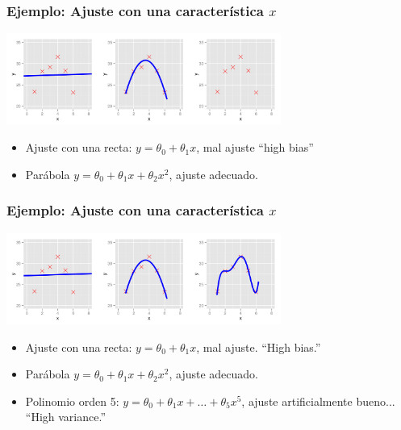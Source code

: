 \documentclass{beamer}
\begin{document}
    \begin{frame}\frametitle{Ejemplo: Ajuste con una característica $x$}
   \begin{overlayarea}{\textwidth}{8cm} 
 \begin{center}
   \includegraphics[height=3cm]{xyregularization120.png}
 \end{center}
     \begin{itemize}
 \item Ajuste con una recta: $y=\theta_0+\theta_1x$, mal ajuste ``high bias'' 
    \item Parábola $y=\theta_0+\theta_1x+\theta_2x^2$, ajuste adecuado.
 \end{itemize}

   \end{overlayarea}

 \end{frame}
      \begin{frame}\frametitle{Ejemplo: Ajuste con una característica $x$}
   \begin{overlayarea}{\textwidth}{8cm} 
 \begin{center}
   \includegraphics[height=3cm]{xyregularization123.png}
 \end{center}
     \begin{itemize}
 \item Ajuste con una recta: $y=\theta_0+\theta_1x$, mal ajuste. ``High bias.'' 
 \item Parábola $y=\theta_0+\theta_1x+\theta_2x^2$, ajuste adecuado.
 \item Polinomio orden 5: $y=\theta_0+\theta_1x+\ldots+\theta_5x^5$, ajuste  artificialmente bueno... ``High variance.''
 \end{itemize}

   \end{overlayarea}

 \end{frame}
\end{document}
